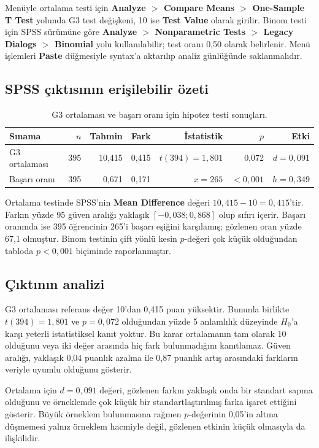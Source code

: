 Menüyle ortalama testi için \textbf{Analyze $>$ Compare Means $>$ One-Sample
T Test} yolunda G3 test değişkeni, 10 ise \textbf{Test Value} olarak girilir.
Binom testi için SPSS sürümüne göre \textbf{Analyze $>$ Nonparametric Tests $>$
Legacy Dialogs $>$ Binomial} yolu kullanılabilir; test oranı 0,50 olarak
belirlenir. Menü işlemleri \textbf{Paste} düğmesiyle syntax'a aktarılıp analiz
günlüğünde saklanmalıdır.

\subsection{SPSS çıktısının erişilebilir özeti}

\begin{table}[htbp]
\centering
\caption{G3 ortalaması ve başarı oranı için hipotez testi sonuçları.}
\small
\begin{tabular}{@{}p{}rrrrrr@{}}
\toprule
Sınama & $n$ & Tahmin & Fark & İstatistik & $p$ & Etki \\
\midrule
G3 ortalaması & 395 & 10,415 & 0,415 & $t(394)=1{,}801$ & 0,072 & $d=0{,}091$ \\
Başarı oranı & 395 & 0,671 & 0,171 & $x=265$ & $<0{,}001$ & $h=0{,}349$ \\
\bottomrule
\end{tabular}
\end{table}

Ortalama testinde SPSS'nin \textbf{Mean Difference} değeri
$10{,}415-10=0{,}415$'tir. Farkın yüzde 95 güven aralığı yaklaşık
$[-0{,}038;0{,}868]$ olup sıfırı içerir. Başarı oranında ise 395 öğrencinin
265'i başarı eşiğini karşılamış; gözlenen oran yüzde 67,1 olmuştur. Binom
testinin çift yönlü kesin $p$-değeri çok küçük olduğundan tabloda
$p<0{,}001$ biçiminde raporlanmıştır.

\subsection{Çıktının analizi}

G3 ortalaması referans değer 10'dan 0,415 puan yüksektir. Bununla birlikte
$t(394)=1{,}801$ ve $p=0{,}072$ olduğundan yüzde 5 anlamlılık düzeyinde
$H_0$'a karşı yeterli istatistiksel kanıt yoktur. Bu karar ortalamanın tam
olarak 10 olduğunu veya iki değer arasında hiç fark bulunmadığını kanıtlamaz.
Güven aralığı, yaklaşık 0,04 puanlık azalma ile 0,87 puanlık artış arasındaki
farkların veriyle uyumlu olduğunu gösterir.

Ortalama için $d=0{,}091$ değeri, gözlenen farkın yaklaşık onda bir standart
sapma olduğunu ve örneklemde çok küçük bir standartlaştırılmış farka işaret
ettiğini gösterir. Büyük örneklem bulunmasına rağmen $p$-değerinin 0,05'in
altına düşmemesi yalnız örneklem hacmiyle değil, gözlenen etkinin küçük
olmasıyla da ilişkilidir.


